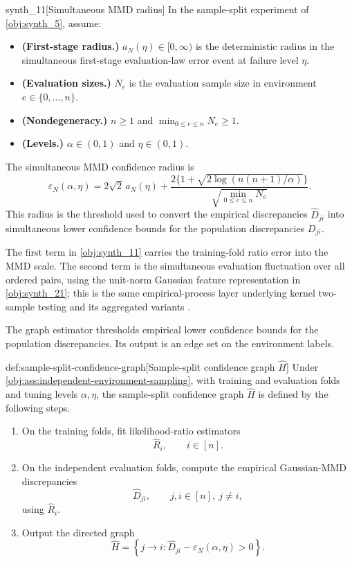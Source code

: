 \begin{definitionv}{synth_11}[Simultaneous MMD radius]
In the sample-split experiment of \cref{obj:synth_5}, assume:
\begin{itemize}
\item \textbf{(First-stage radius.)} \(a_N(\eta)\in[0,\infty)\) is the deterministic radius in the simultaneous first-stage evaluation-law error event at failure level \(\eta\).
\item \textbf{(Evaluation sizes.)} \(N_e\) is the evaluation sample size in environment \(e\in\{0,\ldots,n\}\).
\item \textbf{(Nondegeneracy.)} \(n\ge1\) and \(\min_{0\le e\le n}N_e\ge1\).
\item \textbf{(Levels.)} \(\alpha\in(0,1)\) and \(\eta\in(0,1)\).
\end{itemize}
The simultaneous MMD confidence radius is
\[
\varepsilon_N(\alpha,\eta)
=
2\sqrt 2\,a_N(\eta)
+
\frac{2\{1+\sqrt{2\log(n(n+1)/\alpha)}\}}
{\sqrt{\min_{0\le e\le n}N_e}} .
\]
This radius is the threshold used to convert the empirical discrepancies \(\widehat D_{ji}\) into simultaneous lower confidence bounds for the population discrepancies \(D_{ji}\).
\end{definitionv}

The first term in \cref{obj:synth_11} carries the training-fold ratio error into the MMD scale. The second term is the simultaneous evaluation fluctuation over all ordered pairs, using the unit-norm Gaussian feature representation in \cref{obj:synth_21}; this is the same empirical-process layer underlying kernel two-sample testing and its aggregated variants \citep{GrettonEtAl2012KernelTwoSample,SchrabEtAl2023MMDAgg}.

The graph estimator thresholds empirical lower confidence bounds for the population discrepancies. Its output  is an edge set on the environment labels.

\begin{algorithmv}{def:sample-split-confidence-graph}[Sample-split confidence graph $\widehat H$]
Under \cref{obj:ass:independent-environment-sampling}, with training and evaluation folds and tuning levels \(\alpha,\eta\), the sample-split confidence graph \(\widehat H\) is defined by the following steps.
\begin{enumerate}
\item On the training folds, fit likelihood-ratio estimators
\[
\widehat R_i,
\qquad i\in[n].
\]

\item On the independent evaluation folds, compute the empirical Gaussian-MMD discrepancies
\[
\widehat D_{ji},
\qquad j,i\in[n],\ j\ne i,
\]
using \(\widehat R_i\).

\item Output the directed graph
\[
\widehat H
=
\left\{
j\to i:
\widehat D_{ji}-\varepsilon_N(\alpha,\eta)>0
\right\}.
\]
\end{enumerate}
\end{algorithmv}

